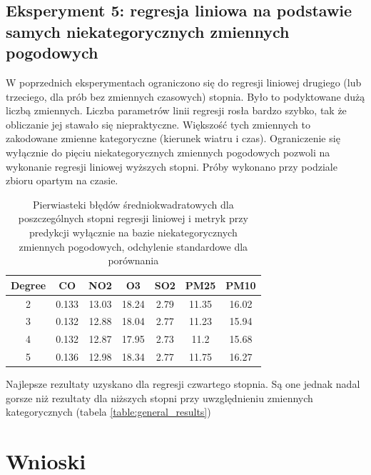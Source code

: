 \documentclass[18pt, letterpaper]{article}
\begin{document}
\subsection{Eksperyment 5: regresja liniowa na podstawie samych niekategorycznych zmiennych pogodowych}

W poprzednich eksperymentach ograniczono się do regresji liniowej drugiego (lub trzeciego, dla prób bez zmiennych czasowych) stopnia. Było to podyktowane dużą liczbą zmiennych. Liczba parametrów linii regresji rosła bardzo szybko, tak że obliczanie jej stawało się niepraktyczne. Większość tych zmiennych to zakodowane zmienne kategoryczne (kierunek wiatru i czas). Ograniczenie się wyłącznie do pięciu niekategorycznych zmiennych pogodowych pozwoli na wykonanie regresji liniowej wyższych stopni. Próby wykonano przy podziale zbioru opartym na czasie.

\begin{table}[H]
\centering
\begin{tabular}{|c|c|c|c|c|c|c|}
\hline
Degree & CO    & NO2   & O3    & SO2  & PM25  & PM10  \\ \hline
2      & 0.133 & 13.03 & 18.24 & 2.79 & 11.35 & 16.02 \\ \hline
3      & 0.132 & 12.88 & 18.04 & 2.77 & 11.23 & 15.94 \\ \hline
4      & 0.132 & 12.87 & 17.95 & 2.73 & 11.2  & 15.68 \\ \hline
5      & 0.136 & 12.98 & 18.34 & 2.77 & 11.75 & 16.27 \\ \hline
\end{tabular}
\caption{Pierwiasteki błędów średniokwadratowych dla poszczególnych stopni regresji liniowej i metryk przy predykcji wyłącznie na bazie niekategorycznych zmiennych pogodowych, odchylenie standardowe dla porównania}
\label{table:non_categorical_results}
\end{table}

Najlepsze rezultaty uzyskano dla regresji czwartego stopnia. Są one jednak nadal gorsze niż rezultaty dla niższych stopni przy uwzględnieniu zmiennych kategorycznych (tabela \ref{table:general_results})

\section{Wnioski}
\end{document}
